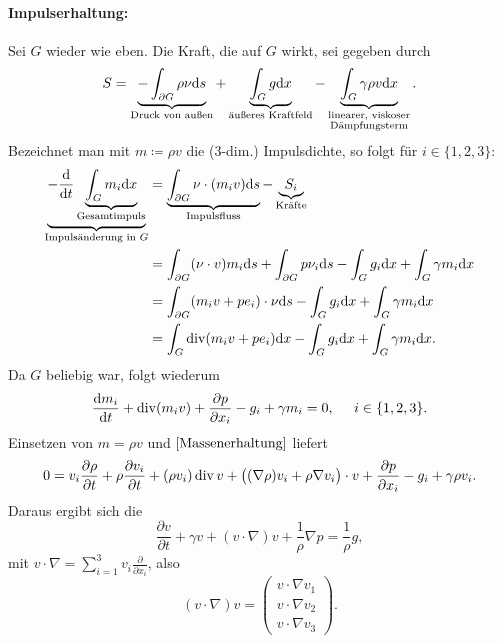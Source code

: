 \paragraph{Impulserhaltung:} Sei \(G\) wieder wie eben. Die Kraft, die auf \(G\) wirkt, sei gegeben durch
\begin{equation*}
	S=\underbrace{-\int_{\partial G}\rho\nu\mathrm{d}s}_{\text{Druck von außen}}+\underbrace{\int_Gg\mathrm{d}x}_{\text{äußeres Kraftfeld}}-\underbrace{\int_G\gamma\rho v\mathrm{d}x}_{\substack{\text{linearer, viskoser}\\\text{Dämpfungsterm}}}.
\end{equation*}
Bezeichnet man mit \(m\coloneqq\rho v\) die (3-dim.) Impulsdichte, so folgt für \(i\in\{1,2,3\}\):
\begin{equation*}
	\begin{aligned}
		\underbrace{-\frac{\mathrm{d}}{\mathrm{d}t}\underbrace{\int_Gm_i\mathrm{d}x}_{\text{Gesamtimpuls}}}_{\text{Impulsänderung in }G}
		&=\underbrace{\int_{\partial G}\nu\cdot(m_iv)\mathrm{d}s}_{\text{Impulsfluss}}-\underbrace{S_i}_{\text{Kräfte}}\\
		&=\int_{\partial G}(\nu\cdot v)m_i\mathrm{d}s+\int_{\partial G}p\nu_i\mathrm{d}s-\int_Gg_i\mathrm{d}x+\int_G\gamma m_i\mathrm{d}x\\
		&=\int_{\partial G}(m_iv+pe_i)\cdot\nu\mathrm{d}s-\int_Gg_i\mathrm{d}x+\int_G\gamma m_i\mathrm{d}x\\
		&=\int_G\operatorname{div}(m_iv+pe_i)\mathrm{d}x -\int_Gg_i\mathrm{d}x+\int_G\gamma m_i\mathrm{d}x.
	\end{aligned}
\end{equation*}
Da \(G\) beliebig war, folgt wiederum
\begin{equation*}
	\frac{\mathrm{d} m_i}{\mathrm{d}t}+\operatorname{div}(m_iv)+\frac{\partial p}{\partial x_i}-g_i+\gamma m_i=0,\;\;\;\;\;i\in\{1,2,3\}.
\end{equation*}
Einsetzen von \(m=\rho v\) und \(\eqref{Massenerhaltung}\) liefert
\begin{equation*}
	0=v_i\frac{\partial\rho}{\partial t}+\rho\frac{\partial v_i}{\partial t}+(\rho v_i)\operatorname{div} v+\big((\nabla\rho)v_i+\rho\nabla v_i\big)\cdot v+\frac{\partial p}{\partial x_i}-g_i+\gamma \rho v_i.
\end{equation*}
Daraus ergibt sich die 
\begin{equation}
	\label{Eulergleichung}
	\frac{\partial v}{\partial t}+\gamma v+(v\cdot\nabla)v+\frac{1}{\rho}\nabla p=\frac{1}{\rho}g,
\end{equation}
mit \(v\cdot\nabla=\sum_{i=1}^3v_i\frac{\partial}{\partial x_i}\), also
\begin{equation*}
	(v\cdot\nabla)v=
	\begin{pmatrix}
		v\cdot\nabla v_1\\
		v\cdot\nabla v_2\\
		v\cdot\nabla v_3
	\end{pmatrix}.
\end{equation*}

